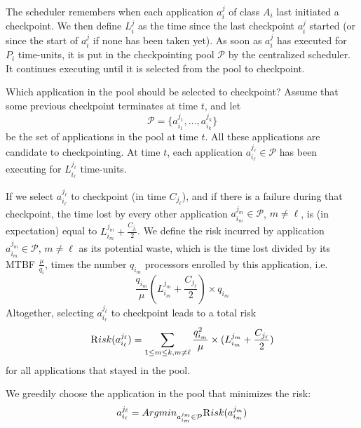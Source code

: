 \documentclass[conference]{IEEEtran}
\newcommand{\app}[1]{A_{#1}}
\newcommand{\application}[2]{a_{#1}^{#2}}
\newcommand{\nbnodes}[1]{q_{#1}}
\newcommand{\period}[1]{P_{#1}}
\newcommand{\mtbfplat}{\mu}
\newcommand{\lastckpt}[2]{L_{#1}^{#2}}
\newcommand{\wastefct}[2]{W_{#1}(#2)}
\newcommand{\pool}{{\mathcal P}}
\newcommand{\risk}{{\textsc Risk}}
\begin{document}
The scheduler remembers when each application $\application{i}{j}$ of class
$\app{i}$ last initiated a checkpoint. We then define $\lastckpt{i}{j}$
as the time since the last checkpoint $\application{i}{j}$ started
(or since the start of $\application{i}{j}$ if none has been taken yet).
As soon as $\application{i}{j}$ has executed for $P_{i}$ time-units,
it is put in the checkpointing pool $\pool$ by the centralized scheduler. It
continues executing until it is selected from the pool to checkpoint.

Which application in the pool should be selected to checkpoint?
Assume that some previous checkpoint terminates at time $t$,
and let
$$\pool = \{ \application{i_{1}}{j_{1}}, \dots, \application{i_{k}}{j_{k}} \}$$
be the set of applications  in the pool at time $t$. All these applications are
candidate to checkpointing. At time $t$, each application $\application{i_{\ell}}{j_{\ell}} \in \pool$
has been executing for  $\lastckpt{i_{\ell}}{j_{\ell}}$ time-units.

If we select $\application{i_{\ell}}{j_{\ell}}$ to checkpoint (in time $C_{j_{\ell}}$),
and if there is a failure during that checkpoint, the time lost by every other application
$\application{i_{m}}{j_{m}} \in \pool$, $m \neq \ell$, is (in expectation) equal to
 $\lastckpt{i_m}{j_m} + \frac{C_{j_{\ell}}}{2}$.
We define the risk incurred by application
$\application{i_{m}}{j_{m}} \in \pool$, $m \neq \ell$
as its potential waste, which is the time lost divided by its MTBF $\frac{\mtbfplat}{\nbnodes{i}}$,
times the number $\nbnodes{i_m}$ processors enrolled by this application, i.e.
$$ \frac{\nbnodes{i_{m}}}{\mtbfplat}  (\lastckpt{i_m}{j_m} + \frac{C_{j_{\ell}}}{2})
\times \nbnodes{i_m} $$
Altogether, selecting $\application{i_{\ell}}{j_{\ell}}$ to checkpoint leads to a total risk
$$\risk(\application{i_{\ell}}{j_{\ell}}) = \sum_{1 \leq m \leq k, m \neq \ell} \frac{\nbnodes{i_{m}}^{2}}{\mtbfplat}  \times (\lastckpt{i_m}{j_m} + \frac{C_{j_{\ell}}}{2})$$
  for all applications that stayed in the pool.

We greedily choose the application in the pool that minimizes the risk:
$$\application{i_{\ell}}{j_{\ell}} = Argmin_{\application{i_m}{j_m} \in \pool} \risk(\application{i_m}{j_m})$$

\end{document}
